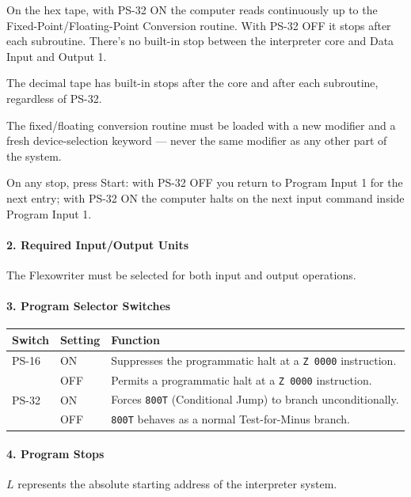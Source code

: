 On the hex tape, with \textsf{PS-32} \textsf{ON} the computer reads continuously up to the Fixed-Point/Floating-Point Conversion routine. With \textsf{PS-32} \textsf{OFF} it stops after each subroutine. There's no built-in stop between the interpreter core and Data Input and Output 1.

The decimal tape has built-in stops after the core and after each subroutine, regardless of \textsf{PS-32}.

The fixed/floating conversion routine must be loaded with a new modifier and a fresh device-selection keyword --- never the same modifier as any other part of the system.

On any stop, press \textsf{Start}: with \textsf{PS-32} \textsf{OFF} you return to Program Input 1 for the next entry; with \textsf{PS-32} \textsf{ON} the computer halts on the next input command inside Program Input 1.

\paragraph{2. Required Input/Output Units}
The Flexowriter must be selected for both input and output operations.

\paragraph{3. Program Selector Switches}
\begin{table}[h]
\centering
\setlength{\extrarowheight}{3pt}
\begin{tabular}{|l|l|p{8.5cm}|}
\hline
\textbf{Switch} & \textbf{Setting} & \textbf{Function} \\ \hline
\textsf{PS-16}  & \textsf{ON}               & Suppresses the programmatic halt at a \texttt{Z 0000} instruction. \\ 
                & \textsf{OFF}              & Permits a programmatic halt at a \texttt{Z 0000} instruction. \\ \hline
\textsf{PS-32}  & \textsf{ON}               & Forces \texttt{800T} (Conditional Jump) to branch unconditionally. \\ 
                & \textsf{OFF}              & \texttt{800T} behaves as a normal Test-for-Minus branch. \\ \hline
\end{tabular}
\end{table}

\paragraph{4. Program Stops}
$L$ represents the absolute starting address of the interpreter system.

